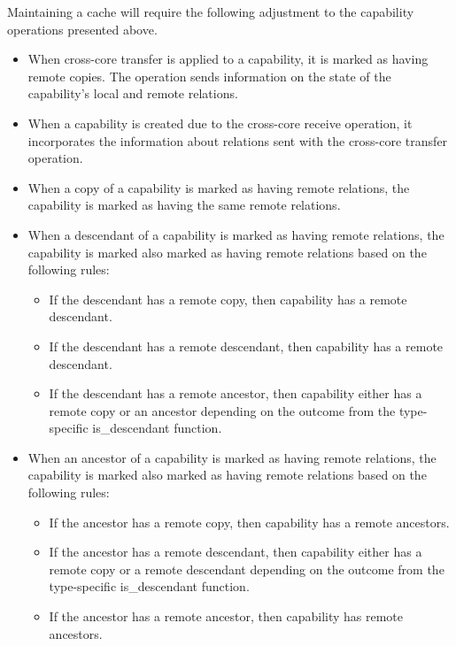 \documentclass[a4paper,twoside]{report} %
\begin{document}
Maintaining a cache will require the following adjustment to the
capability operations presented above.

\begin{itemize}
\item When cross-core transfer is applied to a capability, it is
  marked as having remote copies. The operation sends information on
  the state of the capability's local and remote relations.

\item When a capability is created due to the cross-core receive
  operation, it incorporates the information about relations sent with
  the cross-core transfer operation.

\item When a copy of a capability is marked as having remote
  relations, the capability is marked as having the same remote
  relations.

\item When a descendant of a capability is marked as having remote
  relations, the capability is marked also marked as having remote
  relations based on the following rules:
  \begin{itemize}
  \item If the descendant has a remote copy, then capability has a
    remote descendant.
  \item If the descendant has a remote descendant, then capability has
    a remote descendant.
  \item If the descendant has a remote ancestor, then capability
    either has a remote copy or an ancestor depending on the outcome
    from the type-specific is\_descendant function.
  \end{itemize}

\item When an ancestor of a capability is marked as having remote
  relations, the capability is marked also marked as having remote
  relations based on the following rules:
  \begin{itemize}
  \item If the ancestor has a remote copy, then capability has a
    remote ancestors.
  \item If the ancestor has a remote descendant, then capability
    either has a remote copy or a remote descendant depending on the
    outcome from the type-specific is\_descendant function.
  \item If the ancestor has a remote ancestor, then capability
    has remote ancestors.
  \end{itemize}


\end{itemize}
\end{document}
